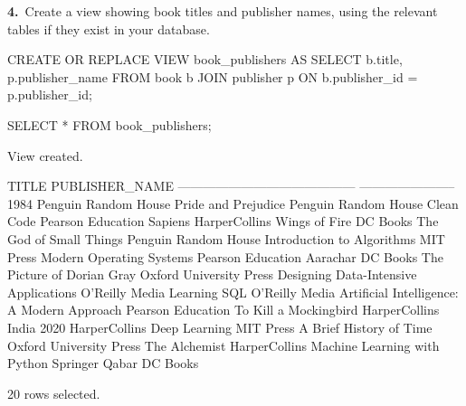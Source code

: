 \noindent\begin{minipage}{\linewidth}
\begingroup{}
{\fontsize{14}{17}\selectfont\textbf{4.}}\ Create a view showing book titles and publisher names, using the relevant tables if they exist in your database.\par
\endgroup\vspace{12pt}


\begin{sqlcode}
CREATE OR REPLACE VIEW book_publishers AS
SELECT b.title, p.publisher_name
FROM book b
JOIN publisher p ON b.publisher_id = p.publisher_id;

SELECT * FROM book_publishers;
\end{sqlcode}

\vspace{18pt}


\begin{sqlout}[fontsize=\small]
View created.

TITLE                                       PUBLISHER_NAME         
------------------------------------------  -----------------------
1984                                        Penguin Random House
Pride and Prejudice                         Penguin Random House
Clean Code                                  Pearson Education
Sapiens                                     HarperCollins
Wings of Fire                               DC Books
The God of Small Things                     Penguin Random House
Introduction to Algorithms                  MIT Press
Modern Operating Systems                    Pearson Education
Aarachar                                    DC Books
The Picture of Dorian Gray                  Oxford University Press
Designing Data-Intensive Applications       O'Reilly Media
Learning SQL                                O'Reilly Media
Artificial Intelligence: A Modern Approach  Pearson Education
To Kill a Mockingbird                       HarperCollins
India 2020                                  HarperCollins
Deep Learning                               MIT Press
A Brief History of Time                     Oxford University Press
The Alchemist                               HarperCollins
Machine Learning with Python                Springer
Qabar                                       DC Books

20 rows selected.
\end{sqlout}
\end{minipage}\par\vspace{24pt}

